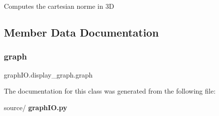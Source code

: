 \begin{DoxyVerb}Computes the cartesian norme in 3D
\end{DoxyVerb}
 

\subsection{Member Data Documentation}
\mbox{\label{classgraph_i_o_1_1display__graph_a3140297ed4f443ab86216214b9f8d1f6}} 
\subsubsection{graph}
{\footnotesize\ttfamily graph\+I\+O.\+display\+\_\+graph.\+graph}



The documentation for this class was generated from the following file\+:\begin{DoxyCompactItemize}
\item 
source/\textbf{ graph\+I\+O.\+py}\end{DoxyCompactItemize}
